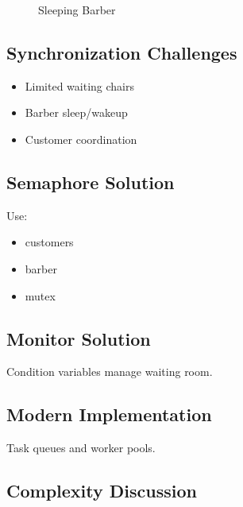 \begin{figure}[H]
\centering
{}
\caption{Sleeping Barber}
\end{figure}

\subsection{Synchronization Challenges}

\begin{itemize}
\item Limited waiting chairs
\item Barber sleep/wakeup
\item Customer coordination
\end{itemize}

\subsection{Semaphore Solution}

Use:

\begin{itemize}
\item customers
\item barber
\item mutex
\end{itemize}

\subsection{Monitor Solution}

Condition variables manage waiting room.

\subsection{Modern Implementation}

Task queues and worker pools.

\subsection{Complexity Discussion}

